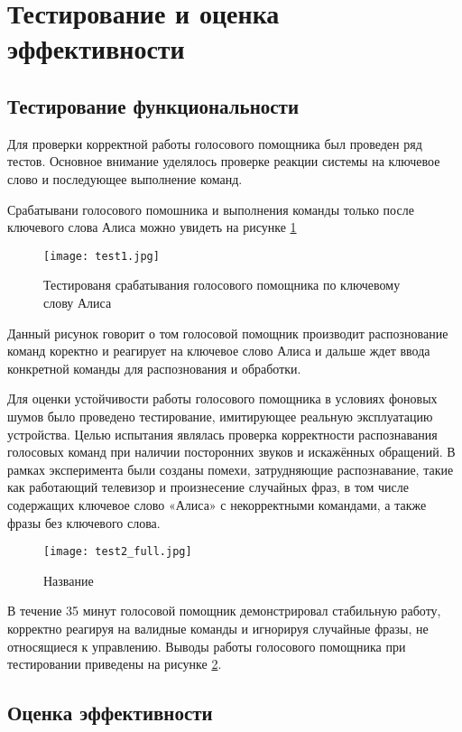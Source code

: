 \section{Тестирование и оценка эффективности}

\subsection{Тестирование функциональности}
Для проверки корректной работы голосового помощника был проведен ряд тестов. Основное внимание уделялось проверке реакции системы на ключевое слово и последующее выполнение команд. 

Срабатывани голосового помошника и выполнения команды только после ключевого слова Алиса можно увидеть на рисунке \ref{fig:test1}

\begin{figure}[H]
	\centering
	\texttt{[image: test1.jpg]}
	\caption{Тестированя срабатывания голосового помощника по ключевому слову Алиса}
	\label{fig:test1}
\end{figure}
Данный рисунок говорит о том голосовой помощник производит распознование команд коректно и реагирует на ключевое слово Алиса и дальше ждет ввода конкретной команды для распознования и обработки.


Для оценки устойчивости работы голосового помощника в условиях фоновых шумов было проведено тестирование, имитирующее реальную эксплуатацию устройства. Целью испытания являлась проверка корректности распознавания голосовых команд при наличии посторонних звуков и искажённых обращений. В рамках эксперимента были созданы помехи, затрудняющие распознавание, такие как работающий телевизор и произнесение случайных фраз, в том числе содержащих ключевое слово «Алиса» с некорректными командами, а также фразы без ключевого слова.

\begin{figure}[H]
	\centering
	\texttt{[image: test2\_full.jpg]}
	\caption{Название }
	\label{fig:test2}
\end{figure}
В течение 35 минут голосовой помощник демонстрировал стабильную работу, корректно реагируя на валидные команды и игнорируя случайные фразы, не относящиеся к управлению. Выводы работы голосового помощника при тестировании приведены на рисунке \ref{fig:test2}.

\subsection{Оценка эффективности}

